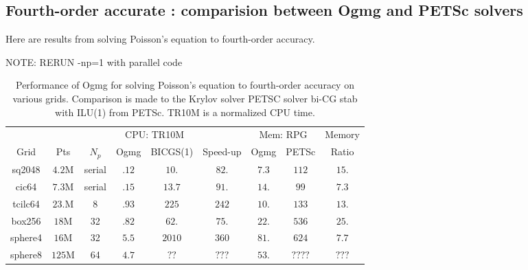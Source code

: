 \clearpage
\subsection{Fourth-order accurate : comparision between Ogmg and PETSc solvers}

Here are results from solving Poisson's equation to fourth-order accuracy.

NOTE: RERUN -np=1 with parallel code

\begin{table}[hbt]
\begin{center}
\begin{tabular}{|c|c|c||c|c|c||c|c|c|} \hline 
      & & & \multicolumn{2}{|c|}{CPU: TR10M} &   & \multicolumn{2}{|c|}{Mem: RPG} &   Memory  \\
   Grid          &  Pts     &  $N_p$   &  Ogmg     &  BICGS(1)  & Speed-up       &   Ogmg   &  PETSc       &  Ratio \\ \hline
 sq2048          & $4.2$M   &  serial  &  $.12$    & $10.$      & $82.$          & $7.3$    & $112 $       & $15.$ \\ 
 cic64           & $7.3$M   &  serial  &  $.15$    & $13.7$     & $91.$          & $14. $   & $99  $       & $7.3$ \\ 
 tcilc64         & $23.$M   &      8   &  $.93$    & $225$      & $242$          & $10. $   & $133 $       & $13.$ \\ 
\hline %
 box256          & $18$M    &     32   &  $.82$    & $62.$      & $75.$          & $22. $   & $536 $       & $25.$ \\ 
 sphere4         & $16$M    &     32   &  $5.5$    & $2010$     & $360$          & $81.$    & $624 $       & $7.7$ \\ 
 sphere8         & $125$M   &     64   &  $4.7$    & $??  $     & $???$          & $53.$    & $????$       & $???$ \\ 
\hline 
\end{tabular}
\end{center}
\caption{Performance of Ogmg for solving Poisson's equation to fourth-order accuracy on various grids. Comparison is made to 
the Krylov solver PETSC solver bi-CG stab with ILU(1) from PETSc.
TR10M is a normalized CPU time. 
}
\label{tab:performanceFourthOrder} 
\end{table}

